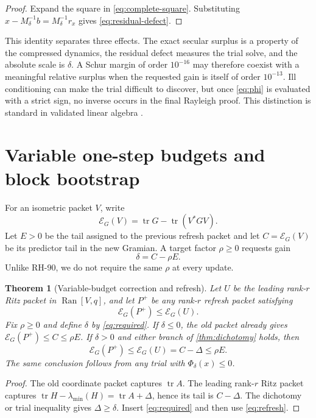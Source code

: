 \documentclass[11pt]{article}
\newtheorem{theorem}{Theorem}[section]
\theoremstyle{definition}
\theoremstyle{remark}
\newcommand{\tr}{\operatorname{tr}}
\newcommand{\Ran}{\operatorname{Ran}}
\newcommand{\E}{\mathcal E}
\begin{document}
\begin{proof}
Expand the square in \eqref{eq:complete-square}.  Substituting
$x-M_\delta^{-1}b=M_\delta^{-1}r_x$ gives
\eqref{eq:residual-defect}.
\end{proof}

This identity separates three effects.  The exact secular surplus is a
property of the compressed dynamics, the residual defect measures the trial
solve, and the absolute scale is $\delta$.  A Schur margin of order
$10^{-16}$ may therefore coexist with a meaningful relative surplus when the
requested gain is itself of order $10^{-13}$.  Ill conditioning can make the
trial difficult to discover, but once \eqref{eq:phi} is evaluated with a
strict sign, no inverse occurs in the final Rayleigh proof.  This distinction
is standard in validated linear algebra \citep{Higham2002,Rump2010}.

\section{Variable one-step budgets and block bootstrap}

For an isometric packet $V$, write
\[
 \E_G(V)=\tr G-\tr(V^*GV).
\]
Let $E>0$ be the tail assigned to the previous refresh packet and let
$C=\E_G(V)$ be its predictor tail in the new Gramian.  A target factor
$\rho\ge0$ requests gain
\begin{equation}
 \delta=C-\rho E.
 \label{eq:required}
\end{equation}
Unlike RH-90, we do not require the same $\rho$ at every update.

\begin{theorem}[Variable-budget correction and refresh]
\label{thm:variable-budget}
Let $U$ be the leading rank-$r$ Ritz packet in $\Ran[V,q]$, and let $P^+$ be
any rank-$r$ refresh packet satisfying
\begin{equation}
 \E_G(P^+)\le\E_G(U).
 \label{eq:refresh}
\end{equation}
Fix $\rho\ge0$ and define $\delta$ by \eqref{eq:required}.
If $\delta\le0$, the old packet already gives
$\E_G(P^+)\le C\le\rho E$.  If $\delta>0$ and either branch of
\cref{thm:dichotomy} holds, then
\begin{equation}
 \E_G(P^+)\le\E_G(U)=C-\Delta\le\rho E.
 \label{eq:one-step-budget}
\end{equation}
The same conclusion follows from any trial with
$\Phi_\delta(x)\le0$.
\end{theorem}

\begin{proof}
The old coordinate packet captures $\tr A$.  The leading rank-$r$ Ritz
packet captures
$\tr H-\lambda_{\min}(H)=\tr A+\Delta$, hence its tail is $C-\Delta$.
The dichotomy or trial inequality gives $\Delta\ge\delta$.  Insert
\eqref{eq:required} and then use \eqref{eq:refresh}.
\end{proof}
\end{document}
